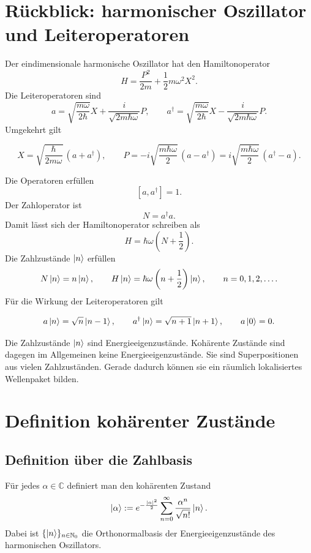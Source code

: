 \section{Rückblick: harmonischer Oszillator und Leiteroperatoren}

Der eindimensionale harmonische Oszillator hat den Hamiltonoperator
\[
    H=\frac{P^2}{2m}+\frac12m\omega^2X^2.
\]
Die Leiteroperatoren sind
\[
    a=\sqrt{\frac{m\omega}{2\hbar}}X+\frac{i}{\sqrt{2m\hbar\omega}}P,
    \qquad
    a^\dagger=\sqrt{\frac{m\omega}{2\hbar}}X-\frac{i}{\sqrt{2m\hbar\omega}}P.
\]
Umgekehrt gilt
\begin{formulabox}
\[
    X=\sqrt{\frac{\hbar}{2m\omega}}\,(a+a^\dagger),
    \qquad
    P=-i\sqrt{\frac{m\hbar\omega}{2}}\,(a-a^\dagger)
    =i\sqrt{\frac{m\hbar\omega}{2}}\,(a^\dagger-a).
\]
\end{formulabox}

Die Operatoren erfüllen
\[
    [a,a^\dagger]=1.
\]
Der Zahloperator ist
\[
    N=a^\dagger a.
\]
Damit lässt sich der Hamiltonoperator schreiben als
\[
    H=\hbar\omega\left(N+\frac12\right).
\]
Die Zahlzustände \(\left|n\right\rangle\) erfüllen
\[
    N\left|n\right\rangle=n\left|n\right\rangle,
    \qquad
    H\left|n\right\rangle=\hbar\omega\left(n+\frac12\right)\left|n\right\rangle,
    \qquad n=0,1,2,\dots.
\]
Für die Wirkung der Leiteroperatoren gilt
\begin{formulabox}
\[
    a\left|n\right\rangle=\sqrt{n}\left|n-1\right\rangle,
    \qquad
    a^\dagger\left|n\right\rangle=\sqrt{n+1}\left|n+1\right\rangle,
    \qquad
    a\left|0\right\rangle=0.
\]
\end{formulabox}

\begin{notebox}
Die Zahlzustände \(\left|n\right\rangle\) sind Energieeigenzustände. Kohärente Zustände sind dagegen im Allgemeinen keine Energieeigenzustände. Sie sind Superpositionen aus vielen Zahlzuständen. Gerade dadurch können sie ein räumlich lokalisiertes Wellenpaket bilden.
\end{notebox}

\section{Definition kohärenter Zustände}

\subsection{Definition über die Zahlbasis}

\begin{definitionbox}
Für jedes \(\alpha\in\mathbb{C}\) definiert man den kohärenten Zustand
\[
    \left|\alpha\right\rangle
    :=e^{-\frac{|\alpha|^2}{2}}
    \sum_{n=0}^{\infty}\frac{\alpha^n}{\sqrt{n!}}\left|n\right\rangle.
\]
Dabei ist \(\{\left|n\right\rangle\}_{n\in\mathbb{N}_0}\) die Orthonormalbasis der Energieeigenzustände des harmonischen Oszillators.
\end{definitionbox}

